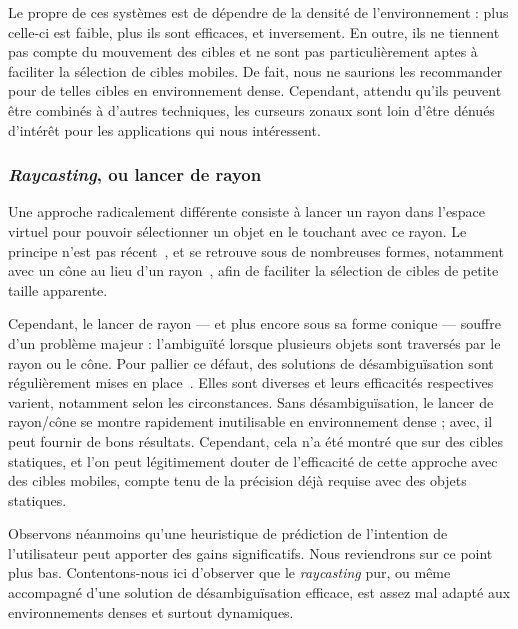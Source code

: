     Le propre de ces systèmes est de dépendre de la densité de l'environnement : plus celle-ci est faible, plus ils sont efficaces, et inversement. En outre, ils ne tiennent pas compte du mouvement des cibles et ne sont pas particulièrement aptes à faciliter la sélection de cibles mobiles. De fait, nous ne saurions les recommander pour de telles cibles en environnement dense. Cependant, attendu qu'ils peuvent être combinés à d'autres techniques, les curseurs zonaux sont loin d'être dénués d'intérêt pour les applications qui nous intéressent.
    
	\subsubsection{\emph{Raycasting}, ou lancer de rayon}
    Une approche radicalement différente consiste à lancer un rayon dans l'espace virtuel pour pouvoir sélectionner un objet en le \og touchant \fg{} avec ce rayon. Le principe n'est pas récent~\cite{liang1994jdcad}, et se retrouve sous de nombreuses formes, notamment avec un cône au lieu d'un rayon~\cite{steed20043d}, afin de faciliter la sélection de cibles de petite taille apparente.
    
    Cependant, le lancer de rayon --- et plus encore sous sa forme conique --- souffre d'un problème majeur : l'ambiguïté lorsque plusieurs objets sont traversés par le rayon ou le cône. Pour pallier ce défaut, des solutions de désambiguïsation sont régulièrement mises en place~\cite{grossman2006design}. Elles sont diverses et leurs efficacités respectives varient, notamment selon les circonstances. Sans désambiguïsation, le lancer de rayon/cône se montre rapidement inutilisable en environnement dense ; avec, il peut fournir de bons résultats. Cependant, cela n'a été montré que sur des cibles statiques, et l'on peut légitimement douter de l'efficacité de cette approche avec des cibles mobiles, compte tenu de la précision déjà requise avec des objets statiques.
    
    Observons néanmoins qu'une heuristique de prédiction de l'intention de l'utilisateur peut apporter des gains significatifs. Nous reviendrons sur ce point plus bas. Contentons-nous ici d'observer que le \emph{raycasting} pur, ou même accompagné d'une solution de désambiguïsation efficace, est assez mal adapté aux environnements denses et surtout dynamiques.
    
